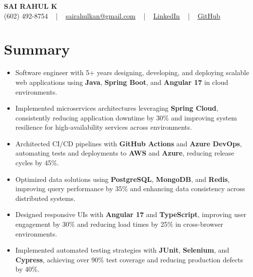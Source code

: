 \documentclass[letterpaper,11pt]{article}
\newcommand{\resumeItem}[1]{
  \item\footnotesize{
    {#1 \vspace{-2pt}}
  }
}
\newcommand{\resumeItemListStart}{\begin{itemize}[leftmargin=*]}
\newcommand{\resumeItemListEnd}{\end{itemize}\vspace{-5pt}}
\begin{document}
\begin{center}
    {\fontsize{14pt}{12pt}\selectfont \textbf{\MakeUppercase{Sai Rahul K}}}\\ \vspace{2pt}
    \fontsize{10pt}{12pt}\selectfont (602) 492-8754 ~ | ~ \href{mailto:sairahulkan@gmail.com}{sairahulkan@gmail.com} ~ | ~
    \href{https://www.linkedin.com/in/rq123/}{\color{blue}\underline{LinkedIn}} ~ | ~
    \href{https://github.com/kanrahuldo}{\color{blue}\underline{GitHub}}~
    \vspace{-8pt}
\end{center}

\section{Summary}
\fontsize{9pt}{10pt}\selectfont
\resumeItemListStart
    \resumeItem{Software engineer with 5+ years designing, developing, and deploying scalable web applications using \textbf{Java}, \textbf{Spring Boot}, and \textbf{Angular 17} in cloud environments.}
    \resumeItem{Implemented microservices architectures leveraging \textbf{Spring Cloud}, consistently reducing application downtime by 30\% and improving system resilience for high-availability services across environments.}
    \resumeItem{Architected CI/CD pipelines with \textbf{GitHub Actions} and \textbf{Azure DevOps}, automating tests and deployments to \textbf{AWS} and \textbf{Azure}, reducing release cycles by 45\%.}
    \resumeItem{Optimized data solutions using \textbf{PostgreSQL}, \textbf{MongoDB}, and \textbf{Redis}, improving query performance by 35\% and enhancing data consistency across distributed systems.}
    \resumeItem{Designed responsive UIs with \textbf{Angular 17} and \textbf{TypeScript}, improving user engagement by 30\% and reducing load times by 25\% in cross-browser environments.}
    \resumeItem{Implemented automated testing strategies with \textbf{JUnit}, \textbf{Selenium}, and \textbf{Cypress}, achieving over 90\% test coverage and reducing production defects by 40\%.}
\resumeItemListEnd
\vspace{-6pt}
\end{document}

